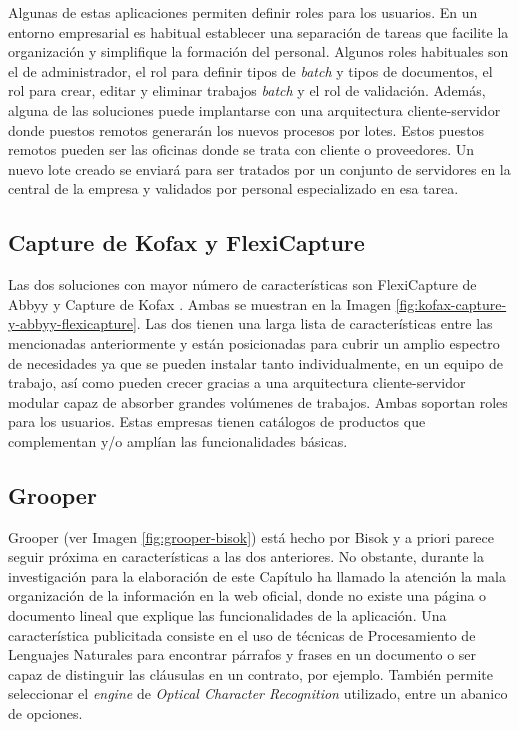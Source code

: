 Algunas de estas aplicaciones permiten definir roles para los usuarios. En un entorno empresarial es habitual establecer una separación de tareas que facilite la organización y simplifique la formación del personal. Algunos roles habituales son el de administrador, el rol para definir tipos de \emph{batch} y tipos de documentos, el rol para crear, editar y eliminar trabajos \emph{batch} y el rol de validación. Además, alguna de las soluciones puede implantarse con una arquitectura cliente-servidor donde puestos remotos generarán los nuevos procesos por lotes. Estos puestos remotos pueden ser las oficinas donde se trata con cliente o proveedores. Un nuevo lote creado se enviará para ser tratados por un conjunto de servidores en la central de la empresa y validados por personal especializado en esa tarea.

\subsection{Capture de Kofax y FlexiCapture}

Las dos soluciones con mayor número de características son FlexiCapture de Abbyy \cite{solucionesComerciales_abbyy_flexicapture4invoices} y Capture de Kofax \cite{solucionesComerciales_kofax_capture}. Ambas se muestran en la Imagen \ref{fig:kofax-capture-y-abbyy-flexicapture}. Las dos tienen una larga lista de características entre las mencionadas anteriormente y están posicionadas para cubrir un amplio espectro de necesidades ya que se pueden instalar tanto individualmente, en un equipo de trabajo, así como pueden crecer gracias a una arquitectura cliente-servidor modular capaz de absorber grandes volúmenes de trabajos. Ambas soportan roles para los usuarios. Estas empresas tienen catálogos de productos que complementan y/o amplían las funcionalidades básicas.

\subsection{Grooper}

Grooper \cite{solucionesComerciales_bisok_grooper} (ver Imagen \ref{fig:grooper-bisok}) está hecho por Bisok y a priori parece seguir próxima en características a las dos anteriores. No obstante, durante la investigación para la elaboración de este Capítulo ha llamado la atención la mala organización de la información en la web oficial, donde no existe una página o documento lineal que explique las funcionalidades de la aplicación. Una característica publicitada consiste en el uso de técnicas de Procesamiento de Lenguajes Naturales para encontrar párrafos y frases en un documento o ser capaz de distinguir las cláusulas en un contrato, por ejemplo. También permite seleccionar el \emph{engine} de \emph{Optical Character Recognition} utilizado, entre un abanico de opciones.


